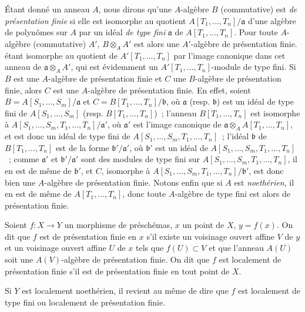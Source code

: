 \begin{env}[1.4.1]
\label{IV.1.4.1-fr}
Étant donné un anneau $A$, nous dirons qu'une $A$-algèbre $B$ (commutative)
est \emph{de présentation finie} si elle est isomorphe au quotient
$A[T_1,\ldots,T_n]/\mathfrak a$ d'une algèbre de polynômes sur $A$ par un
idéal \emph{de type fini} $\mathfrak a$ de $A[T_1,\ldots,T_n]$. Pour toute
$A$-algèbre (commutative) $A'$, $B\otimes_AA'$ est alors une $A'$-algèbre de
présentation finie. étant isomorphe au quotient de $A'[T_1,\ldots,T_n]$ par
l'image canonique dans cet anneau de $\mathfrak a\otimes_AA'$, qui est
évidemment un $A'[T_1,\ldots,T_n]$-module de type fini. Si $B$ est une
$A$-algèbre de présentation finie et $C$ une $B$-algèbre de présentation
finie, alors $C$ est une $A$-algèbre de présentation finie. En effet, soient
$B=A[S_1,\ldots,S_m]/\mathfrak a$ et
$C=B[T_1,\ldots,T_n]/\mathfrak b$, où $\mathfrak a$ (resp. $\mathfrak b$) est
un idéal de type fini de $A[S_1,\ldots,S_m]$ (resp.
$B[T_1,\ldots,T_n]$)~; l'anneau $B[T_1,\ldots,T_n]$ est isomorphe à
$A[S_1,\ldots,S_m,T_1,\ldots,T_n]/\mathfrak a'$, où $\mathfrak a'$ est
l'image canonique de
$\mathfrak a\otimes_AA[T_1,\ldots,T_n]$, et est donc un idéal de type fini de
$A[S_1,\ldots,S_m,T_1,\ldots,T_n]$~; l'idéal $\mathfrak b$ de
$B[T_1,\ldots,T_n]$ est de la forme $\mathfrak b'/\mathfrak a'$, où
$\mathfrak b'$ est un idéal de $A[S_1,\ldots,S_m,T_1,\ldots,T_n]$~; comme
$\mathfrak a'$ et $\mathfrak b'/\mathfrak a'$ sont des modules de type fini
sur $A[S_1,\ldots,S_m,T_1,\ldots,T_n]$, il en est de même de $\mathfrak b'$,
et $C$, isomorphe à
$A[S_1,\ldots,S_m,T_1,\ldots,T_n]/\mathfrak b'$, est donc bien une
$A$-algèbre de présentation finie. Notons enfin que si $A$ est
\emph{noethérien}, il en est de même de $A[T_1,\ldots,T_n]$, donc toute
$A$-algèbre de type fini est alors de présentation finie.
\end{env}

\begin{definition}[1.4.2]
\label{IV.1.4.2-fr}
Soient $f:X\to Y$ un morphisme de préschémas, $x$ un point de $X$, $y=f(x)$.
On dit que $f$ est de présentation finie en $x$ s'il existe un voisinage
ouvert affine $V$ de $y$ et un voisinage ouvert affine $U$ de $x$ tels que
$f(U)\subset V$ et que l'anneau $A(U)$ soit une $A(V)$-algèbre de présentation
finie. On dit que $f$ est localement de présentation finie s'il est de
présentation finie en tout point de $X$.
\end{definition}

Si $Y$ est localement noethérien, il revient au même de dire que $f$ est
localement de type fini ou localement de présentation finie.

